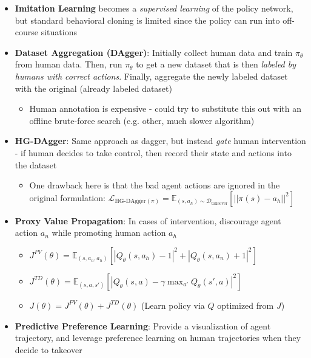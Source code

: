 \documentclass[twocolumn]{article}
\providecommand{\tightlist}{%
  \setlength{\itemsep}{\GlobalItemSep}\setlength{\parskip}{\GlobalListParSkip}}
\newlength{\GlobalItemSep}
\newlength{\GlobalListParSkip}
\begin{document}
\begin{itemize}
\tightlist
\item
  \textbf{Imitation Learning} becomes a \emph{supervised learning} of
  the policy network, but standard behavioral cloning is limited since
  the policy can run into off-course situations
\item
  \textbf{Dataset Aggregation (DAgger)}: Initially collect human data
  and train \(\pi_\theta\) from human data. Then, run \(\pi_\theta\) to
  get a new dataset that is then \emph{labeled by humans with correct
  actions}. Finally, aggregate the newly labeled dataset with the
  original (already labeled dataset)

  \begin{itemize}
  \tightlist
  \item
    Human annotation is expensive - could try to substitute this out
    with an offline brute-force search (e.g. other, much slower
    algorithm)
  \end{itemize}
\item
  \textbf{HG-DAgger}: Same approach as dagger, but instead \emph{gate}
  human intervention - if human decides to take control, then record
  their state and actions into the dataset

  \begin{itemize}
  \tightlist
  \item
    One drawback here is that the bad agent actions are ignored in the
    original formulation:
    \(\mathcal{L}_{\text{HG-DAgger}(\pi)} = \mathbb{E}_{(s, a_h) \sim \mathcal{D}_{\text{takeover}}}[||\pi(s) - a_h||^2]\)
  \end{itemize}
\item
  \textbf{Proxy Value Propagation}: In cases of intervention, discourage
  agent action \(a_n\) while promoting human action \(a_h\)

  \begin{itemize}
  \tightlist
  \item
    \(J^{PV}(\theta) = \mathbb{E}_{(s, a_n, a_h)}[|Q_\theta (s, a_h) - 1|^2 + |Q_\theta(s, a_n) + 1|^2]\)
  \item
    \(J^{TD}(\theta) = \mathbb{E}_{(s, a, s')}[|Q_\theta(s,a) - \gamma \max_{a'} Q_\theta (s', a)|^2]\)
  \item
    \(J(\theta) = J^{PV}(\theta) + J^{TD}(\theta)\) (Learn policy via
    \(Q\) optimized from \(J\))
  \end{itemize}
\item
  \textbf{Predictive Preference Learning}: Provide a visualization of
  agent trajectory, and leverage preference learning on human
  trajectories when they decide to takeover


\end{itemize}
\end{document}
